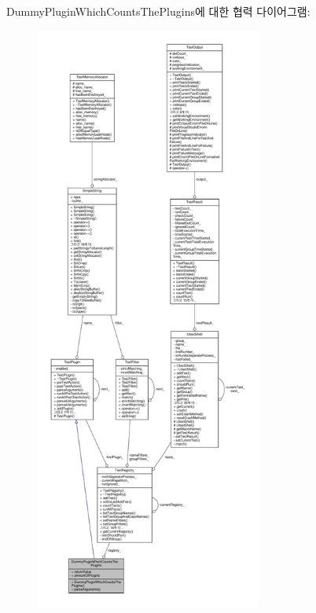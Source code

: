 Dummy\+Plugin\+Which\+Counts\+The\+Plugins에 대한 협력 다이어그램\+:
\nopagebreak
\begin{figure}[H]
\begin{center}
\leavevmode
\includegraphics[height=550pt]{class_dummy_plugin_which_counts_the_plugins__coll__graph}
\end{center}
\end{figure}
